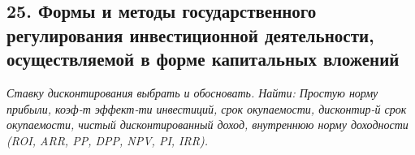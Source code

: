 \subsection*{25. Формы и методы государственного регулирования инвестиционной деятельности, осуществляемой в форме капитальных вложений}

\textit{Ставку дисконтирования выбрать и обосновать.
Найти: Простую норму прибыли, коэф-т эффект-ти инвестиций, срок окупаемости, дисконтир-й срок окупаемости, чистый дисконтированный доход, внутреннюю норму доходности (ROI, ARR, PP, DPP, NPV, PI, IRR).}

